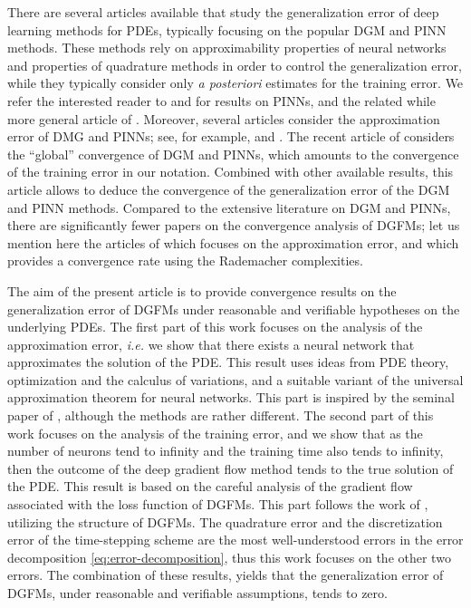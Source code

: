 \documentclass[11pt,a4paper,reqno]{amsart}
\numberwithin{equation}{section}
\theoremstyle{plain}
\theoremstyle{definition}
\begin{document}
There are several articles available that study the generalization error of deep learning methods for PDEs, typically focusing on the popular DGM and PINN methods. 
These methods rely on approximability properties of neural networks and properties of quadrature methods in order to control the generalization error, while they typically consider only \textit{a posteriori} estimates for the training error. 
We refer the interested reader to \citet{Mishra2022PINNs} and \citet{Gazoulis2025} for results on PINNs, and the related while more general article of \citet{loulakis2023newapproachgeneralisationerror}.
Moreover, several articles consider the approximation error of DMG and PINNs; see, for example, \citet{sirignano2018dgm,Shin_Darbon_Karniadakis} and \citet{abdo2026convergenceanalysispinnsfractional}.
The recent article of \citet{jiang2023global} considers the ``global'' convergence of DGM and PINNs, which amounts to the convergence of the training error in our notation. 
Combined with other available results, this article allows to deduce the convergence of the generalization error of the DGM and PINN methods.
Compared to the extensive literature on DGM and PINNs, there are significantly fewer papers on the convergence analysis of DGFMs; let us mention here the articles of \citet{Dondl2022} which focuses on the approximation error, and \citet{doi:10.1142/S021953052350015X} which provides a convergence rate using the Rademacher complexities.

The aim of the present article is to provide convergence results on the generalization error of DGFMs under reasonable and verifiable hypotheses on the underlying PDEs.
The first part of this work focuses on the analysis of the approximation error, \textit{i.e.} we show that there exists a neural network that approximates the solution of the PDE.
This result uses ideas from PDE theory, optimization and the calculus of variations, and a suitable variant of the universal approximation theorem for neural networks.
This part is inspired by the seminal paper of \citet{sirignano2018dgm}, although the methods are rather different.
The second part of this work focuses on the analysis of the training error, and we show that as the number of neurons tend to infinity and the training time also tends to infinity, then the outcome of the deep gradient flow method tends to the true solution of the PDE. 
This result is based on the careful analysis of the gradient flow associated with the loss function of DGFMs.
This part follows the work of \citet{jiang2023global}, utilizing the structure of DGFMs.
The quadrature error and the discretization error of the time-stepping scheme are the most well-understood errors in the error decomposition \eqref{eq:error-decomposition}, thus this work focuses on the other two errors.
The combination of these results, yields that the generalization error of DGFMs, under reasonable and verifiable assumptions, tends to zero.
\end{document}
